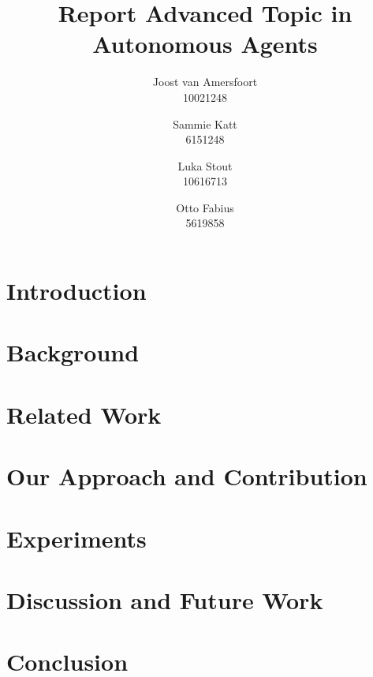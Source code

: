 \documentclass{article}
\title{Report Advanced Topic in Autonomous Agents}
\author{Joost van Amersfoort \\ 10021248 \and Sammie Katt \\ 6151248 \and Luka Stout \\ 10616713 \and Otto Fabius \\ 5619858}
\begin{document}
\maketitle
\tableofcontents
\newpage

\section{Introduction}


\section{Background}\label{background}


\section{Related Work}\label{related}


\section{Our Approach and Contribution}\label{contrib}


\section{Experiments}\label{experiments}


\section{Discussion and Future Work}\label{discussion}


\section{Conclusion}\label{conclusion}


\pagebreak 
\nocite{*}


\end{document}
